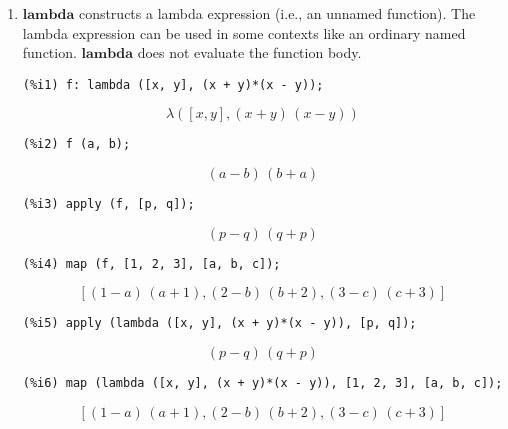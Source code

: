 \documentclass[12pt,leqno]{article}
\begin{document}
\begin{enumerate}
\item $\mathbf{lambda}$ constructs a lambda expression (i.e., an unnamed function).
The lambda expression can be used in some contexts like an ordinary named function.
$\mathbf{lambda}$ does not evaluate the function body.
\begin{verbatim}
(%i1) f: lambda ([x, y], (x + y)*(x - y));
\end{verbatim}
\begin{equation}
\lambda\left(\left[ x , y \right]  , \left(x+y\right)\,\left(x-y\right)\right)\tag{\%o1}
\label{eq:doc-group1-code25-1-1}
\end{equation}
\begin{verbatim}
(%i2) f (a, b);
\end{verbatim}
\begin{equation}
\left(a-b\right)\,\left(b+a\right)\tag{\%o2}
\label{eq:doc-group1-code25-2-1}
\end{equation}
\begin{verbatim}
(%i3) apply (f, [p, q]);
\end{verbatim}
\begin{equation}
\left(p-q\right)\,\left(q+p\right)\tag{\%o3}
\label{eq:doc-group1-code25-3-1}
\end{equation}
\begin{verbatim}
(%i4) map (f, [1, 2, 3], [a, b, c]);
\end{verbatim}
\begin{equation}
\left[ \left(1-a\right)\,\left(a+1\right) , \left(2-b\right)\,\left(b+2\right) , \left(3-c\right)\,\left(c+3\right) \right] \tag{\%o4}
\label{eq:doc-group1-code25-4-1}
\end{equation}
\begin{verbatim}
(%i5) apply (lambda ([x, y], (x + y)*(x - y)), [p, q]);
\end{verbatim}
\begin{equation}
\left(p-q\right)\,\left(q+p\right)\tag{\%o5}
\label{eq:doc-group1-code25-5-1}
\end{equation}
\begin{verbatim}
(%i6) map (lambda ([x, y], (x + y)*(x - y)), [1, 2, 3], [a, b, c]);
\end{verbatim}
\begin{equation}
\left[ \left(1-a\right)\,\left(a+1\right) , \left(2-b\right)\,\left(b+2\right) , \left(3-c\right)\,\left(c+3\right) \right] \tag{\%o6}
\label{eq:doc-group1-code25-6-1}
\end{equation}


\end{enumerate}
\end{document}
